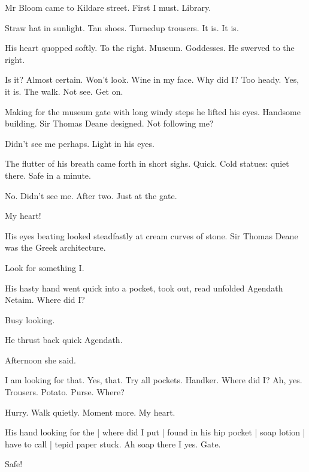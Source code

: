 Mr Bloom came to Kildare street.
First I must.
Library.

Straw hat in sunlight.
Tan shoes.
Turnedup trousers.
It is.
It is.

His heart quopped softly.
To the right.
Museum.
Goddesses.
He swerved to the right.%

Is it?
Almost certain.
Won't look.
Wine in my face.
Why did I?
Too heady.
Yes,
it is.
The walk.
Not see.
Get on.

Making for the museum gate with long windy steps he lifted his eyes.
Handsome building.
Sir Thomas Deane designed.
Not following me?

Didn't see me perhaps.
Light in his eyes.

The flutter of his breath came forth in short sighs.
Quick.
Cold statues:
quiet there.
Safe in a minute.

No.
Didn't see me.
After two.
Just at the gate.

My heart!

His eyes beating looked steadfastly at cream curves of stone.
Sir Thomas
Deane was the Greek architecture.

Look for something I.

His hasty hand went quick into a pocket,
took out,
read unfolded Agendath Netaim.
Where did I?

Busy looking.

He thrust back quick Agendath.

Afternoon she said.

I am looking for that.
Yes, that.
Try all pockets.
Handker.
Where did I?
Ah, yes.
Trousers.
Potato.
Purse.
Where?

Hurry.
Walk quietly.
Moment more.
My heart.

His hand looking for the |
where did I put |
found in his hip pocket |
soap lotion |
have to call |
tepid paper stuck.
Ah soap there I yes.
Gate.

Safe!


